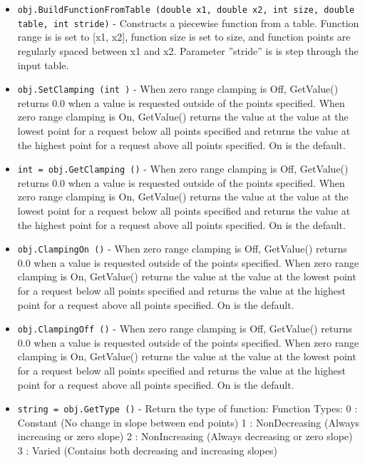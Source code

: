 \begin{itemize}
\item  \verb|obj.BuildFunctionFromTable (double x1, double x2, int size, double table, int stride)| -  Constructs a piecewise function from a table.  Function range is
 is set to [x1, x2], function size is set to size, and function points
 are regularly spaced between x1 and x2.  Parameter ''stride'' is
 is step through the input table.  

\item  \verb|obj.SetClamping (int )| -  When zero range clamping is Off, GetValue() returns 0.0 when a
 value is requested outside of the points specified.
 When zero range clamping is On, GetValue() returns the value at
 the value at the lowest point for a request below all points 
 specified and returns the value at the highest point for a request 
 above all points specified. On is the default.

\item  \verb|int = obj.GetClamping ()| -  When zero range clamping is Off, GetValue() returns 0.0 when a
 value is requested outside of the points specified.
 When zero range clamping is On, GetValue() returns the value at
 the value at the lowest point for a request below all points 
 specified and returns the value at the highest point for a request 
 above all points specified. On is the default.

\item  \verb|obj.ClampingOn ()| -  When zero range clamping is Off, GetValue() returns 0.0 when a
 value is requested outside of the points specified.
 When zero range clamping is On, GetValue() returns the value at
 the value at the lowest point for a request below all points 
 specified and returns the value at the highest point for a request 
 above all points specified. On is the default.

\item  \verb|obj.ClampingOff ()| -  When zero range clamping is Off, GetValue() returns 0.0 when a
 value is requested outside of the points specified.
 When zero range clamping is On, GetValue() returns the value at
 the value at the lowest point for a request below all points 
 specified and returns the value at the highest point for a request 
 above all points specified. On is the default.

\item  \verb|string = obj.GetType ()| -  Return the type of function:
 Function Types:
    0 : Constant        (No change in slope between end points)
    1 : NonDecreasing   (Always increasing or zero slope)
    2 : NonIncreasing   (Always decreasing or zero slope)
    3 : Varied          (Contains both decreasing and increasing slopes)


\end{itemize}
